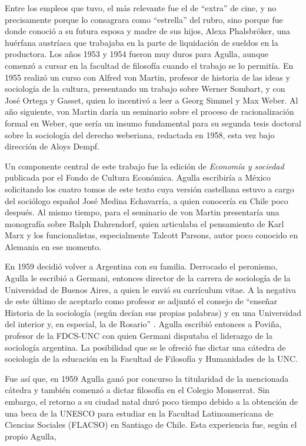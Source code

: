 Entre los empleos que tuvo, el más relevante fue el de \enquote{extra} de cine, y no precisamente porque lo consagrara como \enquote{estrella} del rubro, sino porque fue donde conoció a su futura esposa y madre de sus hijos, Alexa Phalsbröker, una huérfana austríaca que trabajaba en la parte de liquidación de sueldos en la productora. Los años 1953 y 1954 fueron muy duros para Agulla, aunque comenzó a cursar en la facultad de filosofía cuando el trabajo se lo permitía. En 1955 realizó un curso con Alfred von Martin, profesor de historia de las ideas y sociología de la cultura, presentando un trabajo sobre Werner Sombart, y con José Ortega y Gasset, quien lo incentivó a leer a Georg Simmel y Max Weber. Al año siguiente, von Martin daría un seminario sobre el proceso de racionalización formal en Weber, que sería un insumo fundamental para su segunda tesis doctoral sobre la sociología del derecho weberiana, redactada en 1958, esta vez bajo dirección de Aloys Dempf.

Un componente central de este trabajo fue la edición de \emph{Economía y sociedad} publicada por el Fondo de Cultura Económica. Agulla escribiría a México solicitando los cuatro tomos de este texto cuya versión castellana estuvo a cargo del sociólogo español José Medina Echavarría, a quien conocería en Chile poco después. Al mismo tiempo, para el seminario de von Martin presentaría una monografía sobre Ralph Dahrendorf, quien articulaba el pensamiento de Karl Marx y los funcionalistas, especialmente Talcott Parsons, autor poco conocido en Alemania en ese momento.

En 1959 decidió volver a Argentina con su familia. Derrocado el peronismo, Agulla le escribió a Germani, entonces director de la carrera de sociología de la Universidad de Buenos Aires, a quien le envió su currículum vitae. A la negativa de este último de aceptarlo como profesor se adjuntó el consejo de \enquote{enseñar Historia de la sociología (según decían sus propias palabras) y en una Universidad del interior y, en especial, la de Rosario} \parencite[77]{1634-AGULLA1997}. Agulla escribió entonces a Poviña, profesor de la FDCS-UNC con quien Germani disputaba el liderazgo de la sociología argentina. La posibilidad que se le ofreció fue dictar una cátedra de sociología de la educación en la Facultad de Filosofía y Humanidades de la UNC.

Fue así que, en 1959 Agulla ganó por concurso la titularidad de la mencionada cátedra y también comenzó a dictar filosofía en el Colegio Monserrat. Sin embargo, el retorno a su ciudad natal duró poco tiempo debido a la obtención de una beca de la UNESCO para estudiar en la Facultad Latinoamericana de Ciencias Sociales (FLACSO) en Santiago de Chile. Esta experiencia fue, según el propio Agulla,

